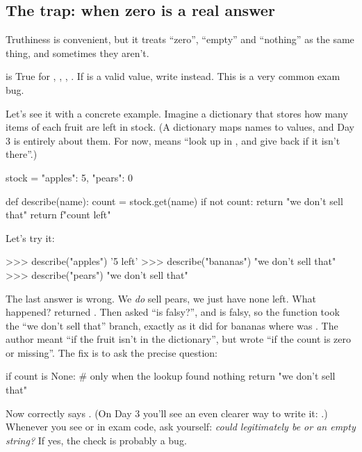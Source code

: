 \documentclass[10pt,a4paper]{article}
\begin{document}
\subsection{The trap: when zero is a real answer}
Truthiness is convenient, but it treats “zero”, “empty” and “nothing” as the same thing, and sometimes they aren’t.
\begin{trapbox}
 is True for , \code{\textquotedbl{}\textquotedbl{}}, \code{[]}, . If  is a valid value, write  instead. This is a very common exam bug.
\end{trapbox}
Let’s see it with a concrete example. Imagine a dictionary that stores how many items of each fruit are left in stock. (A dictionary maps names to values, and Day 3 is entirely about them. For now,  means “look up  in , and give back  if it isn’t there”.)
\begin{pycode}
stock = {"apples": 5, "pears": 0}

def describe(name):
    count = stock.get(name)
    if not count:
        return "we don't sell that"
    return f"{count} left"
\end{pycode}
Let’s try it:
\begin{txtcode}
>>> describe("apples")
'5 left'
>>> describe("bananas")
"we don't sell that"
>>> describe("pears")
"we don't sell that"
\end{txtcode}
The last answer is wrong. We \emph{do} sell pears, we just have none left. What happened?  returned . Then  asked “is  falsy?”, and  is falsy, so the function took the “we don’t sell that” branch, exactly as it did for bananas where  was .
The author meant “if the fruit isn’t in the dictionary”, but wrote “if the count is zero or missing”. The fix is to ask the precise question:
\begin{pycode}
    if count is None:          # only when the lookup found nothing
        return "we don't sell that"
\end{pycode}
Now  correctly says . (On Day 3 you’ll see an even clearer way to write it: .)
Whenever you see  or  in exam code, ask yourself: \emph{could  legitimately be  or an empty string?} If yes, the check is probably a bug.
\setcounter{section}{3}
\end{document}

